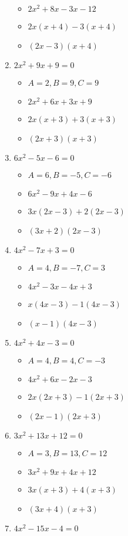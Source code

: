 \begin{enumerate}
\begin{itemize}
  \item $2x^{2}+8x-3x-12$
  \item $2x(x+4)-3(x+4)$
  \item $(2x-3)(x+4)$
  \end{itemize}
\item $2x^{2} + 9x + 9 = 0$
  \begin{itemize}
  \item $A=2, B=9, C=9$
  \item $2x^{2}+6x+3x+9$
  \item $2x(x+3)+3(x+3)$
  \item $(2x+3)(x+3)$
  \end{itemize}
\item $6x^{2} - 5x - 6 = 0$
  \begin{itemize}
  \item $A=6, B=-5, C=-6$
  \item $6x^{2}-9x+4x-6$
  \item $3x(2x-3)+2(2x-3)$
  \item $(3x+2)(2x-3)$
  \end{itemize}
\item $4x^{2} - 7x + 3 = 0$
  \begin{itemize}
  \item $A=4, B=-7, C=3$
  \item $4x^{2}-3x-4x+3$
  \item $x(4x-3)-1(4x-3)$
  \item $(x-1)(4x-3)$
  \end{itemize}
\item $4x^{2} + 4x - 3 = 0$
  \begin{itemize}
  \item $A=4, B=4, C=-3$
  \item $4x^{2}+6x-2x-3$
  \item $2x(2x+3)-1(2x+3)$
  \item $(2x-1)(2x+3)$
  \end{itemize}
\item $3x^{2} + 13x + 12 = 0$
  \begin{itemize}
  \item $A=3, B=13, C=12$
  \item $3x^{2}+9x+4x+12$
  \item $3x(x+3)+4(x+3)$
  \item $(3x+4)(x+3)$
  \end{itemize}
\item $4x^{2} - 15x - 4 = 0$

\end{enumerate}

